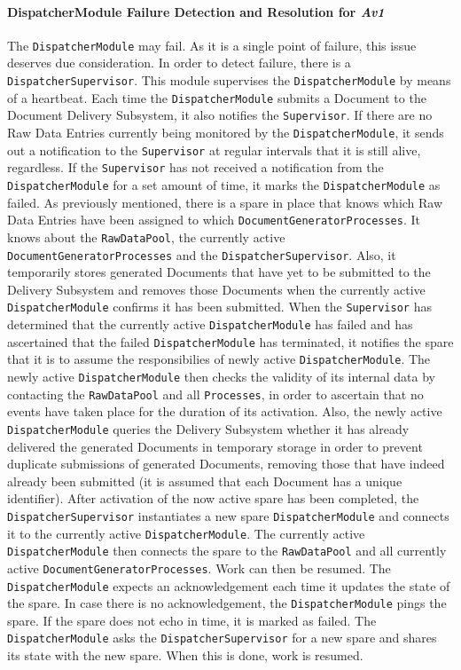 \documentclass[a4paper,10pt]{article}
\begin{document}
\paragraph{DispatcherModule Failure Detection and Resolution for \emph{Av1}}
The \texttt{DispatcherModule} may fail. As it is a single point of failure, this issue deserves due consideration. In order to detect failure, there is a \texttt{DispatcherSupervisor}. This module supervises the \texttt{DispatcherModule} by means of a heartbeat. Each time the \texttt{DispatcherModule} submits a Document to the Document Delivery Subsystem, it also notifies the \texttt{Supervisor}. If there are no Raw Data Entries currently being monitored by the \texttt{DispatcherModule}, it sends out a notification to the \texttt{Supervisor} at regular intervals that it is still alive, regardless. If the \texttt{Supervisor} has not received a notification from the \texttt{DispatcherModule} for a set amount of time, it marks the \texttt{DispatcherModule} as failed. 
As previously mentioned, there is a spare in place that knows which Raw Data Entries have been assigned to which \texttt{DocumentGeneratorProcesses}. It knows about the \texttt{RawDataPool}, the currently active \texttt{DocumentGeneratorProcesses} and the \texttt{DispatcherSupervisor}. Also, it temporarily stores generated Documents that have yet to be submitted to the Delivery Subsystem and removes those Documents when the currently active \texttt{DispatcherModule} confirms it has been submitted. When the \texttt{Supervisor} has determined that the currently active \texttt{DispatcherModule} has failed and has ascertained that the failed \texttt{DispatcherModule} has terminated, it notifies the spare that it is to assume the responsibilies of newly active \texttt{DispatcherModule}. The newly active \texttt{DispatcherModule} then checks the validity of its internal data by contacting the \texttt{RawDataPool} and all \texttt{Processes}, in order to ascertain that no events have taken place for the duration of its activation. Also, the newly active \texttt{DispatcherModule} queries the Delivery Subsystem whether it has already delivered the generated Documents in temporary storage in order to prevent duplicate submissions of generated Documents, removing those that have indeed already been submitted (it is assumed that each Document has a unique identifier). After activation of the now active spare has been completed, the \texttt{DispatcherSupervisor} instantiates a new spare \texttt{DispatcherModule} and connects it to the currently active \texttt{DispatcherModule}. The currently active \texttt{DispatcherModule} then connects the spare to the \texttt{RawDataPool} and all currently active \texttt{DocumentGeneratorProcesses}. Work can then be resumed.
The \texttt{DispatcherModule} expects an acknowledgement each time it updates the state of the spare. In case there is no acknowledgement, the \texttt{DispatcherModule} pings the spare. If the spare does not echo in time, it is marked as failed. The \texttt{DispatcherModule} asks the \texttt{DispatcherSupervisor} for a new spare and shares its state with the new spare. When this is done, work is resumed.
\end{document}
